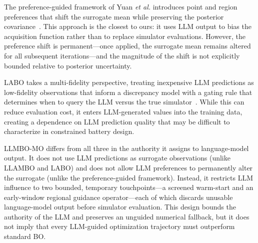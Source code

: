 The preference-guided framework of Yuan \textit{et al.} introduces point and
region preferences that shift the surrogate mean while preserving the posterior
covariance~\cite{ref16}.
This approach is the closest to ours: it uses LLM output to bias the
acquisition function rather than to replace simulator evaluations.
However, the preference shift is permanent---once applied, the surrogate mean
remains altered for all subsequent iterations---and the magnitude of the shift
is not explicitly bounded relative to posterior uncertainty.

LABO takes a multi-fidelity perspective, treating inexpensive LLM predictions
as low-fidelity observations that inform a discrepancy model with a gating
rule that determines when to query the LLM versus the true simulator~\cite{refLABO}.
While this can reduce evaluation cost, it enters LLM-generated values into the
training data, creating a dependence on LLM prediction quality that may be
difficult to characterize in constrained battery design.

LLMBO-MO differs from all three in the authority it assigns to language-model
output.
It does not use LLM predictions as surrogate observations (unlike LLAMBO and
LABO) and does not allow LLM preferences to permanently alter the surrogate
(unlike the preference-guided framework).
Instead, it restricts LLM influence to two bounded, temporary touchpoints---a
screened warm-start and an early-window regional guidance operator---each of
which discards unusable language-model output before simulator evaluation.
This design bounds the authority of the LLM and preserves an unguided numerical
fallback, but it does not imply that every LLM-guided optimization trajectory
must outperform standard BO.
